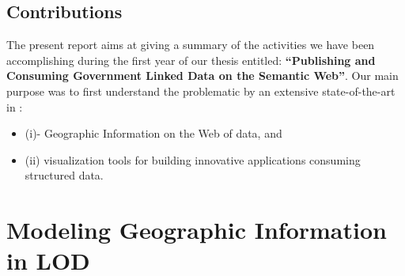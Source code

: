 \documentclass[a4paper,11pt]{report}
\begin{document}

\section{Contributions}
The present report aims at giving a summary of the activities we have been accomplishing
during the first year of our thesis entitled: \textbf{``Publishing and Consuming Government Linked Data on the Semantic Web''}. Our main purpose was to first understand the problematic by an extensive state-of-the-art in : 
\begin{itemize}
\item (i)- Geographic Information on the Web of data, and 
\item (ii) visualization tools for building innovative applications consuming structured data. 
\end{itemize}


\chapter{Modeling Geographic Information in LOD}
\end{document}
